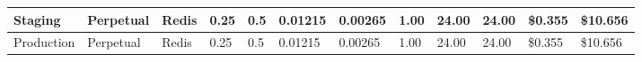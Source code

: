 \begin{landscape}
\begin{table}[!htbp]
\begin{tabular}{llllllllllll}
    \multicolumn{1}{|l|}{\cellcolor[HTML]{FFFF00}Staging} &
      \multicolumn{1}{l|}{\cellcolor[HTML]{C6E0B4}Perpetual} &
      \multicolumn{1}{l|}{\cellcolor[HTML]{FF3B3B}Redis} &
      \multicolumn{1}{l|}{\cellcolor[HTML]{F8696B}0.25} &
      \multicolumn{1}{l|}{\cellcolor[HTML]{F8696B}0.5} &
      \multicolumn{1}{l|}{\cellcolor[HTML]{63BE7B}0.01215} &
      \multicolumn{1}{l|}{\cellcolor[HTML]{63BE7B}0.00265} &
      \multicolumn{1}{l|}{\cellcolor[HTML]{FFEB84}1.00} &
      \multicolumn{1}{l|}{\cellcolor[HTML]{F8696B}24.00} &
      \multicolumn{1}{l|}{\cellcolor[HTML]{F8696B}24.00} &
      \multicolumn{1}{l|}{\cellcolor[HTML]{FFEB84}\$0.355} &
      \multicolumn{1}{l|}{\cellcolor[HTML]{FFEB84}\$10.656} \\ \hline
    \multicolumn{1}{|l|}{\cellcolor[HTML]{EFC321}Production} &
      \multicolumn{1}{l|}{\cellcolor[HTML]{C6E0B4}Perpetual} &
      \multicolumn{1}{l|}{\cellcolor[HTML]{FF3B3B}Redis} &
      \multicolumn{1}{l|}{\cellcolor[HTML]{F8696B}0.25} &
      \multicolumn{1}{l|}{\cellcolor[HTML]{F8696B}0.5} &
      \multicolumn{1}{l|}{\cellcolor[HTML]{63BE7B}0.01215} &
      \multicolumn{1}{l|}{\cellcolor[HTML]{63BE7B}0.00265} &
      \multicolumn{1}{l|}{\cellcolor[HTML]{FFEB84}1.00} &
      \multicolumn{1}{l|}{\cellcolor[HTML]{F8696B}24.00} &
      \multicolumn{1}{l|}{\cellcolor[HTML]{F8696B}24.00} &
      \multicolumn{1}{l|}{\cellcolor[HTML]{FFEB84}\$0.355} &
      \multicolumn{1}{l|}{\cellcolor[HTML]{FFEB84}\$10.656} \\ \hline
    \end{tabular}
\end{table}
\end{landscape}

\FloatBarrier
